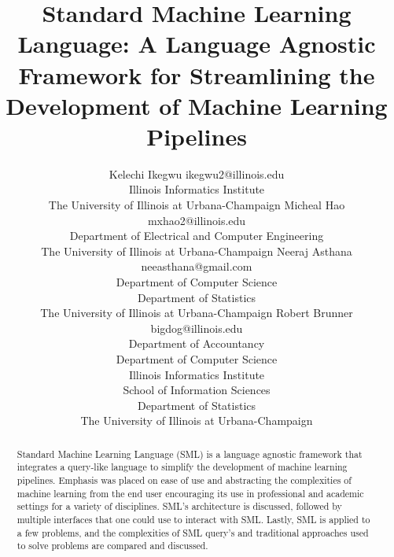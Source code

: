 \documentclass[jair,twoside,11pt,theapa]{article}
\begin{document}
\title{Standard Machine Learning Language: A Language Agnostic Framework for Streamlining the Development of Machine Learning Pipelines}

\author{\name Kelechi Ikegwu \email ikegwu2@illinois.edu \\
       \addr Illinois Informatics Institute \\ The University of Illinois at Urbana-Champaign
       \AND
       \name Micheal Hao  \email mxhao2@illinois.edu \\
       \addr Department of Electrical and Computer Engineering \\ The University of Illinois at Urbana-Champaign
       \AND
       \name Neeraj Asthana \email neeasthana@gmail.com \\
       \addr Department of Computer Science \\ Department of Statistics \\ The University of Illinois at Urbana-Champaign
       \AND
       \name Robert Brunner \email bigdog@illinois.edu\\
       \addr Department of Accountancy \\  Department of Computer Science \\ Illinois Informatics Institute \\  School of Information Sciences \\ Department of Statistics \\  The University of Illinois at Urbana-Champaign}


\maketitle


\begin{abstract}
Standard Machine Learning Language (SML) is a language agnostic framework that integrates a query-like language to simplify the development of machine learning pipelines. Emphasis was placed on ease of use and abstracting the complexities of machine learning from the end user encouraging its use in professional and academic settings for a variety of disciplines. SML's architecture is discussed, followed by multiple interfaces that one could use to interact with SML. Lastly, SML is applied to a few problems, and the  complexities of SML query's and traditional approaches used to solve problems are compared and discussed.
\end{abstract}
\end{document}
